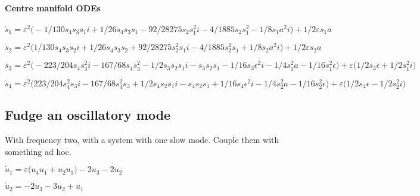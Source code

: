 \documentclass[11pt,a5paper]{article}
\begin{document}
\paragraph{Centre manifold ODEs} 

\begin{math}
\dot s_{1}=\varepsilon ^{2} \big(-1/130 s_{4} s_{3} s_{1} i+1/26 s_{4} s
_{3} s_{1}-92/28275 s_{2} s_{1}^{2} i-4/1885 s_{2} s_{1}^{2}-1/8 s_{1} a
^{2} i\big)+1/2 \varepsilon  s_{1} a
\end{math}\par

\begin{math}
\dot s_{2}=\varepsilon ^{2} \big(1/130 s_{4} s_{3} s_{2} i+1/26 s_{4} s_
{3} s_{2}+92/28275 s_{2}^{2} s_{1} i-4/1885 s_{2}^{2} s_{1}+1/8 s_{2} a
^{2} i\big)+1/2 \varepsilon  s_{2} a
\end{math}\par

\begin{math}
\dot s_{3}=\varepsilon ^{2} \big(-223/204 s_{4} s_{3}^{2} i-167/68 s_{4}
 s_{3}^{2}-1/2 s_{3} s_{2} s_{1} i-s_{3} s_{2} s_{1}-1/16 s_{3} 
\epsilon ^{2} i-1/4 s_{1}^{2} a-1/16 s_{1}^{2} \epsilon \big)+
\varepsilon  \big(1/2 s_{3} \epsilon +1/2 s_{1}^{2} i\big)
\end{math}\par

\begin{math}
\dot s_{4}=\varepsilon ^{2} \big(223/204 s_{4}^{2} s_{3} i-167/68 s_{4}
^{2} s_{3}+1/2 s_{4} s_{2} s_{1} i-s_{4} s_{2} s_{1}+1/16 s_{4} 
\epsilon ^{2} i-1/4 s_{2}^{2} a-1/16 s_{2}^{2} \epsilon \big)+
\varepsilon  \big(1/2 s_{4} \epsilon -1/2 s_{2}^{2} i\big)
\end{math}






\subsection{Fudge an oscillatory mode}
With frequency two, with a system with one slow mode.
Couple them with something ad hoc.

\begin{math}
\dot u_{1}=\varepsilon  \big(u_{4} u_{1}+u_{2} u_{1}\big)-2 u_{3}-2 u_{2
}
\end{math}\par

\begin{math}
\dot u_{2}=-2 u_{3}-3 u_{2}+u_{1}
\end{math}\par
\end{document}
